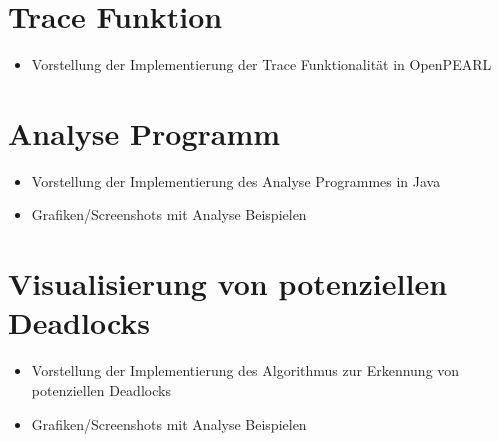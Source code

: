 \section{Trace Funktion}\label{Implementierung:Trace Funktion}
\begin{itemize}
  \item Vorstellung der Implementierung der Trace Funktionalität in OpenPEARL
\end{itemize}

\section{Analyse Programm}
\begin{itemize}
  \item Vorstellung der Implementierung des Analyse Programmes in Java
  \item Grafiken/Screenshots mit Analyse Beispielen
\end{itemize}

\section{Visualisierung von potenziellen Deadlocks}
\begin{itemize}
  \item Vorstellung der Implementierung des Algorithmus zur Erkennung von
  potenziellen Deadlocks
  \item Grafiken/Screenshots mit Analyse Beispielen
\end{itemize}